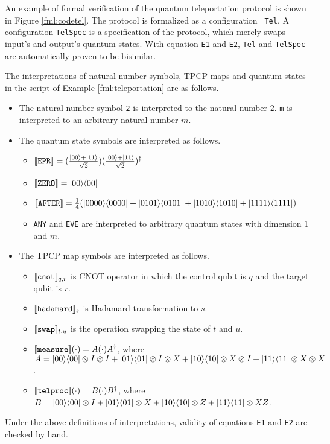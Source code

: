 \begin{ex}
\label{fml:teleportation}
 An example of formal verification of the quantum teleportation protocol is
 shown in Figure \ref{fml:codetel}.
 The protocol is formalized as a configuration {\tt
 Tel}. A configuration {\tt TelSpec} is a specification of the protocol, which
 merely swaps input's and output's quantum states.
 With equation {\tt E1} and {\tt E2}, {\tt Tel} and {\tt TelSpec} are
 automatically proven to be bisimilar.
\end{ex}
The interpretations of natural number symbols, TPCP maps and
quantum states in the script of Example \ref{fml:teleportation} are as follows.
\begin{itemize}
\item The natural number symbol {\tt 2} is interpreted to the
      natural number $2$.
      {\tt m} is interpreted to an arbitrary natural number $m$.
\item The quantum state symbols are interpreted as follows.
      \begin{itemize}
       \item $[\![\mathtt{EPR}]\!] = (\frac{|00\rangle+|11\rangle}{\sqrt{2}})
	     (\frac{|00\rangle+|11\rangle}{\sqrt{2}})^\dagger$
       \item $[\![\mathtt{ZERO}]\!] = |00\rangle\langle 00|$
       \item $[\![\mathtt{AFTER}]\!] = \frac{1}{4}(
	     |0000\rangle\langle 0000|+|0101\rangle\langle 0101|
	     +|1010\rangle\langle 1010|+|1111\rangle\langle 1111|)$
       \item {\tt ANY} and {\tt EVE} are interpreted to arbitrary quantum
	     states with dimension $1$ and $m$.
      \end{itemize}
\item The TPCP map symbols 
      are interpreted as follows.
      \begin{itemize}
       \item $[\![\texttt{cnot}]\!]_{q,r}$ is CNOT operator
	     in which the control qubit is $q$ and the target qubit
	     is $r$.
       \item $[\![\texttt{hadamard}]\!]_s$ is Hadamard
	     transformation to $s$.
       \item $[\![\texttt{swap}]\!]_{t,u}$ is the operation
	     swapping the state of $t$ and $u$.
       \item $[\![\texttt{measure}]\!](\cdot) = A(\cdot)A^\dagger$,
	     where $A = |00\rangle\langle 00|\otimes I \otimes
	     I + |01\rangle\langle 01| \otimes I \otimes X + 
	     |10\rangle\langle 10| \otimes X \otimes I + |11\rangle\langle 11|
	     \otimes X \otimes X$.     
       \item $[\![\texttt{telproc}]\!](\cdot) = B(\cdot)B^\dagger$,
	     where $B = |00\rangle\langle 00|\otimes I +
	     |01\rangle\langle 01| \otimes X + 
	     |10\rangle\langle 10| \otimes Z + |11\rangle\langle 11| \otimes XZ$.
      \end{itemize}
\end{itemize}
Under the above definitions of interpretations, 
validity of equations {\tt E1} and {\tt E2} are checked by hand.

